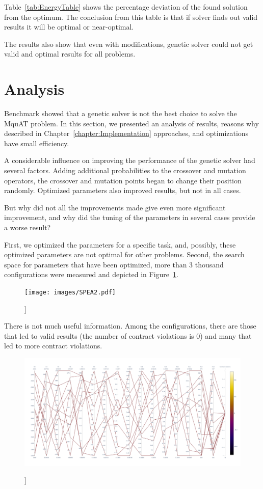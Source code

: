 Table~\ref{tab:EnergyTable} shows the percentage deviation of the found solution from the optimum.
The conclusion from this table is that if solver finds out valid results it will be optimal or near-optimal.


The results also show that even with modifications, genetic solver could not get valid and optimal results for all problems.


\section{Analysis}

Benchmark showed that a genetic solver is not the best choice to solve the MquAT problem.
In this section, we presented an analysis of results, reasons why described in Chapter~\ref{chapter:Implementation} approaches, and optimizations have small efficiency.

A considerable influence on improving the performance of the genetic solver had several factors. Adding additional probabilities to the crossover and mutation operators, the crossover and mutation points began to change their position randomly.
Optimized parameters also improved results, but not in all cases.

But why did not all the improvements made give even more significant improvement, and why did the tuning of the parameters in several cases provide a worse result?

First, we optimized the parameters for a specific task, and, possibly, these optimized parameters are not optimal for other problems.
Second, the search space for parameters that have been optimized, more than 3 thousand configurations were measured and depicted in Figure~\ref{fig:SearchSpaceViewFull}.

\begin{figure}
	\centering
	\texttt{[image: images/SPEA2.pdf]}
	\caption[]]{}
	\label{fig:SearchSpaceViewFull}
\end{figure}

There is not much useful information. Among the configurations, there are those that led to valid results (the number of contract violations is 0) and many that led to more contract violations.

\begin{figure}
	\centering
	\includegraphics[width=\textwidth]{images/SPEA2_Zero_validity.html.pdf}
	\caption[]]{}
	\label{fig:SearchSpaceValid}
\end{figure}

